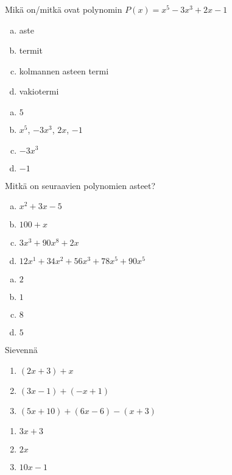 \begin{tehtavasivu}
\begin{tehtava}
	Mikä on/mitkä ovat polynomin $P(x) = x^5-3x^3+2x-1$
	\begin{enumerate}[a)]
		\item aste
		\item termit
		\item kolmannen asteen termi
		\item vakiotermi
	\end{enumerate}

	\begin{vastaus}
		\begin{enumerate}[a)]
			\item $5$
			\item $x^5$, $-3x^3$, $2x$, $-1$
			\item $-3x^3$
			\item $-1$
		\end{enumerate}
	\end{vastaus}
\end{tehtava}

\begin{tehtava}
	Mitkä on seuraavien polynomien asteet?
	\begin{enumerate}[a)]
		\item $x^2 + 3x - 5$
		\item $100 + x$
		\item $3x^3 + 90x^8 + 2x$
		\item $12x^1 + 34x^2 + 56x^3 + 78x^5 + 90x^5$
	\end{enumerate}

	\begin{vastaus}
		\begin{enumerate}[a)]
			\item $2$
			\item $1$
			\item $8$
			\item $5$
		\end{enumerate}
	\end{vastaus}
\end{tehtava}

\begin{tehtava}
     Sievennä
     \begin{enumerate}
         \item $(2x + 3) + x $
         \item $(3x - 1) + (-x + 1)$
         \item $(5x + 10) + (6x - 6) - (x + 3)$
     \end{enumerate}
     \begin{vastaus}
         \begin{enumerate}
             \item $3x + 3$
             \item $2x$
             \item $10x - 1$
         \end{enumerate}
     \end{vastaus}
 \end{tehtava}


\end{tehtavasivu}
